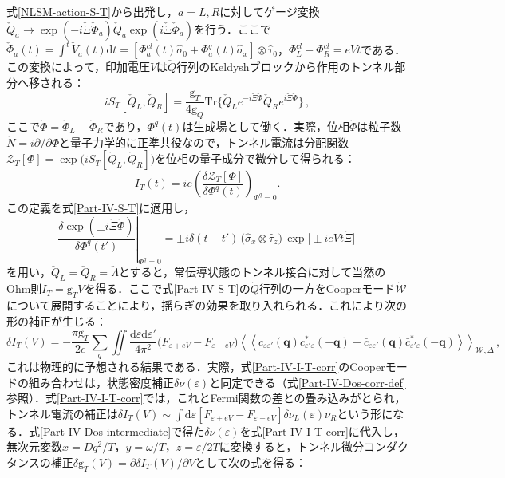 \documentclass[a4paper,11pt]{ltjsarticle}
\def\Tr{\mathrm{Tr}}
\def\d{\mathrm{d}}
\begin{document}
式\eqref{NLSM-action-S-T}から出発し，$a=L,R$に対してゲージ変換$\check{Q}_{a}\to\exp(-i\check{\Xi}\check{\Phi}_{a})\check{Q}_{a}\exp(i\check{\Xi}\check{\Phi}_{a})$を行う．ここで$\check{\Phi}_{a}(t)=\int^{t}\check{V}_{a}(t)\d t=[\Phi^{cl}_{a}(t)\hat{\sigma}_{0}+\Phi^{q}_{a}(t)\hat{\sigma}_{x}]\otimes\hat{\tau}_{0}$，$\Phi^{cl}_{L}-\Phi^{cl}_{R}=eVt$である．この変換によって，印加電圧$V$は$\check{Q}$行列のKeldyshブロックから作用のトンネル部分へ移される：
\begin{equation}\label{Part-IV-S-T}
iS_{T}[\check{Q}_{L},\check{Q}_{R}]=\frac{\mathrm{g}_{T}}{4\mathrm{g}_{Q}}
\Tr\big\{\check{Q}_{L}e^{-i\check{\Xi}\check{\Phi}}
\check{Q}_{R}e^{i\check{\Xi}\check{\Phi}}\big\}\,,
\end{equation}
ここで$\check{\Phi}=\check{\Phi}_{L}-\check{\Phi}_{R}$であり，$\Phi^{q}(t)$は生成場として働く．実際，位相$\check{\Phi}$は粒子数$\check{N}=i\partial/\partial\Phi$と量子力学的に正準共役なので，トンネル電流は分配関数$\mathcal{Z}_{T}[\Phi]=\exp\big(iS_{T}[\check{Q}_{L},\check{Q}_{R}]\big)$を位相の量子成分で微分して得られる：
\begin{equation}\label{Part-IV-I-T}
I_{T}(t)=ie\left(\frac{\delta\mathcal{Z}_{T}[\Phi]}{\delta\Phi^{q}(t)}
\right)_{\Phi^{q}=0}.
\end{equation}
この定義を式\eqref{Part-IV-S-T}に適用し，
\begin{equation}\label{Part-IV-derivative}
\left.\frac{\delta \exp(\pm
i\check{\Xi}\check{\Phi})}{\delta\Phi^{q}(t')}\right|_{\Phi^{q}=0}=\pm
i\delta(t-t')\,\big(\hat{\sigma}_{x}\otimes\hat{\tau}_{z}\big)\,\exp\big[\pm
ieVt\check{\Xi}\big]\,
\end{equation}
を用い，$\check{Q}_{L}=\check{Q}_{R}=\check{\Lambda}$とすると，常伝導状態のトンネル接合に対して当然のOhm則$I_{T}=\mathrm{g}_{T}V$を得る．ここで式\eqref{Part-IV-S-T}の$\check{Q}$行列の一方をCooperモード$\check{\mathcal{W}}$について展開することにより，揺らぎの効果を取り入れられる．これにより次の形の補正が生じる：
\begin{equation}\label{Part-IV-I-T-corr}
\delta I_{T}(V)=-\frac{\pi
\mathrm{g}_{T}}{2e}\sum_{q}\iint\frac{\d\varepsilon\d\varepsilon'}{4\pi^{2}}
\big(F_{\varepsilon+eV}-F_{\varepsilon-eV}\big)
\left\langle\left\langle c_{\varepsilon\varepsilon'}(\mathbf{q})
c^{*}_{\varepsilon'\varepsilon}(-\mathbf{q})+
\bar{c}_{\varepsilon\varepsilon'}(\mathbf{q})
\bar{c}^{*}_{\varepsilon'\varepsilon}(-\mathbf{q})
\right\rangle\right\rangle_{\mathcal{W},\Delta}\,,
\end{equation}
これは物理的に予想される結果である．実際，式\eqref{Part-IV-I-T-corr}のCooperモードの組み合わせは，状態密度補正$\delta\nu(\varepsilon)$と同定できる（式\eqref{Part-IV-Dos-corr-def}参照）．式\eqref{Part-IV-I-T-corr}では，これとFermi関数の差との畳み込みがとられ，トンネル電流の補正は$\delta I_T(V)\sim\int\d\varepsilon[F_{\varepsilon+eV}-F_{\varepsilon-eV}]\delta\nu_{L}(\varepsilon)\nu_{R}$という形になる．式\eqref{Part-IV-Dos-intermediate}で得た$\delta\nu(\varepsilon)$を式\eqref{Part-IV-I-T-corr}に代入し，無次元変数$x=Dq^{2}/T$，$y=\omega/T$，$z=\varepsilon/2T$に変換すると，トンネル微分コンダクタンスの補正$\delta \mathrm{g}_{T}(V)=\partial\delta I_{T}(V)/\partial V$として次の式を得る：
\end{document}
